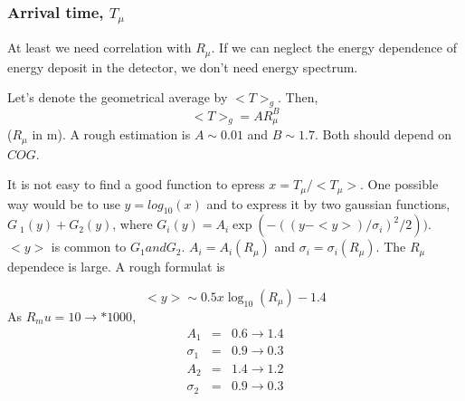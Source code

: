 \documentclass[a4j]{jarticle}
\begin{document}
\subsubsection{Arrival time, $T_\mu$}

At least we need correlation with $R_\mu$.  If we can neglect the energy
dependence of energy deposit in the detector, we don't need 
energy spectrum.


Let's denote the geometrical average by $<T>_g$. Then,  
\begin{equation}
 <T>_g = A R_\mu^B  
\end{equation}
 ($R_\mu$ in m).  A rough estimation is
$ A\sim  0.01$ and  $B \sim 1.7$. Both should depend on $COG$.


It is not easy to find a good function to epress $x=T_\mu/<T_\mu>$.
One possible way would be to use $y=log_{10}(x)$ and to
express it by two gaussian functions, $G~_1(y)+G_2(y)$,
where $G_i(y)=A_i \exp(-( (y-<y>)/\sigma_i)^2/2))$.
$<y>$ is common to $G_1 and G_2$.
  $A_i=A_i(R_\mu)$ and $\sigma_i=\sigma_i(R_\mu)$.  The $R_\mu$
dependece is large.  A rough formulat is

\begin{equation}
<y> \sim 0.5 x \log_{10}(R_\mu) - 1.4
\end{equation}
As   $R_mu= 10 \rightarrow  *1000$, 
\begin{eqnarray}
A_1& =& 0.6 \rightarrow  1.4\\
\sigma_1 & = & 0.9 \rightarrow 0.3 \\
A_2 & = & 1.4 \rightarrow 1.2  \\
\sigma_2 & =& 0.9\rightarrow 0.3 \\
\end{eqnarray}
\end{document}
